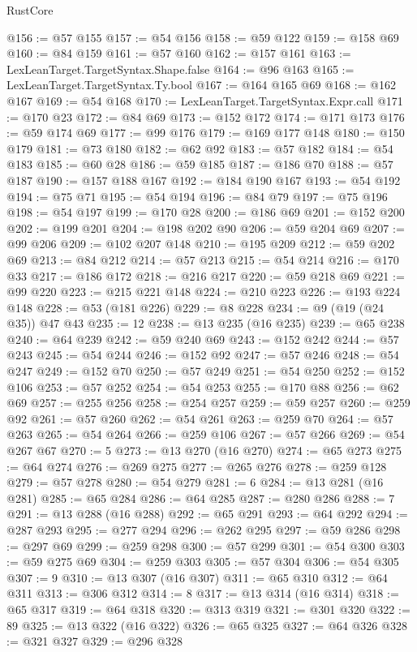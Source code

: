 \begin{lexlean}{RustCore}
\begin{coremodule}
@156 := @57 @155
@157 := @54 @156
@158 := @59 @122
@159 := @158 @69
@160 := @84 @159
@161 := @57 @160
@162 := @157 @161
@163 := LexLeanTarget.TargetSyntax.Shape.false
@164 := @96 @163
@165 := LexLeanTarget.TargetSyntax.Ty.bool
@167 := @164 @165 @69
@168 := @162 @167
@169 := @54 @168
@170 := LexLeanTarget.TargetSyntax.Expr.call
@171 := @170 @23
@172 := @84 @69
@173 := @152 @172
@174 := @171 @173
@176 := @59 @174 @69
@177 := @99 @176
@179 := @169 @177 @148
@180 := @150 @179
@181 := @73 @180
@182 := @62 @92
@183 := @57 @182
@184 := @54 @183
@185 := @60 @28
@186 := @59 @185
@187 := @186 @70
@188 := @57 @187
@190 := @157 @188 @167
@192 := @184 @190 @167
@193 := @54 @192
@194 := @75 @71
@195 := @54 @194
@196 := @84 @79
@197 := @75 @196
@198 := @54 @197
@199 := @170 @28
@200 := @186 @69
@201 := @152 @200
@202 := @199 @201
@204 := @198 @202 @90
@206 := @59 @204 @69
@207 := @99 @206
@209 := @102 @207 @148
@210 := @195 @209
@212 := @59 @202 @69
@213 := @84 @212
@214 := @57 @213
@215 := @54 @214
@216 := @170 @33
@217 := @186 @172
@218 := @216 @217
@220 := @59 @218 @69
@221 := @99 @220
@223 := @215 @221 @148
@224 := @210 @223
@226 := @193 @224 @148
@228 := @53 (@181 @226)
@229 := @8 @228
@234 := @9 (@19 (@24 @35)) @47 @43
@235 := 12
@238 := @13 @235 (@16 @235)
@239 := @65 @238
@240 := @64 @239
@242 := @59 @240 @69
@243 := @152 @242
@244 := @57 @243
@245 := @54 @244
@246 := @152 @92
@247 := @57 @246
@248 := @54 @247
@249 := @152 @70
@250 := @57 @249
@251 := @54 @250
@252 := @152 @106
@253 := @57 @252
@254 := @54 @253
@255 := @170 @88
@256 := @62 @69
@257 := @255 @256
@258 := @254 @257
@259 := @59 @257
@260 := @259 @92
@261 := @57 @260
@262 := @54 @261
@263 := @259 @70
@264 := @57 @263
@265 := @54 @264
@266 := @259 @106
@267 := @57 @266
@269 := @54 @267 @67
@270 := 5
@273 := @13 @270 (@16 @270)
@274 := @65 @273
@275 := @64 @274
@276 := @269 @275
@277 := @265 @276
@278 := @259 @128
@279 := @57 @278
@280 := @54 @279
@281 := 6
@284 := @13 @281 (@16 @281)
@285 := @65 @284
@286 := @64 @285
@287 := @280 @286
@288 := 7
@291 := @13 @288 (@16 @288)
@292 := @65 @291
@293 := @64 @292
@294 := @287 @293
@295 := @277 @294
@296 := @262 @295
@297 := @59 @286
@298 := @297 @69
@299 := @259 @298
@300 := @57 @299
@301 := @54 @300
@303 := @59 @275 @69
@304 := @259 @303
@305 := @57 @304
@306 := @54 @305
@307 := 9
@310 := @13 @307 (@16 @307)
@311 := @65 @310
@312 := @64 @311
@313 := @306 @312
@314 := 8
@317 := @13 @314 (@16 @314)
@318 := @65 @317
@319 := @64 @318
@320 := @313 @319
@321 := @301 @320
@322 := 89
@325 := @13 @322 (@16 @322)
@326 := @65 @325
@327 := @64 @326
@328 := @321 @327
@329 := @296 @328

\end{coremodule}
\end{lexlean}
